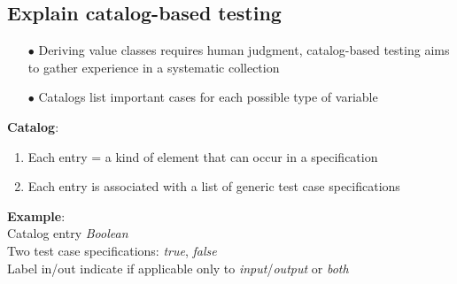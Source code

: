 \documentclass{article}
\begin{document}
\subsection{Explain catalog-based testing}
\begin{itemize}
    \item [$\bullet$]Deriving value classes requires human judgment, catalog-based testing aims to gather experience in a systematic collection
    \item [$\bullet$]Catalogs list important cases for each possible type of variable
\end{itemize}

\noindent \textbf{Catalog}:
\begin{enumerate}
    \item Each
entry
=
a
kind
of
element
that
can
occur
in
a
specification
    \item Each
entry
is
associated
with
a
list
of
generic
test
case
specifications\\
\end{enumerate}

\noindent \textbf{Example}:\\
Catalog entry \textit{Boolean}\\
Two test case specifications: \textit{true}, \textit{false}\\
Label in/out indicate if applicable only to \textit{input}/\textit{output} or \textit{both}
\end{document}
